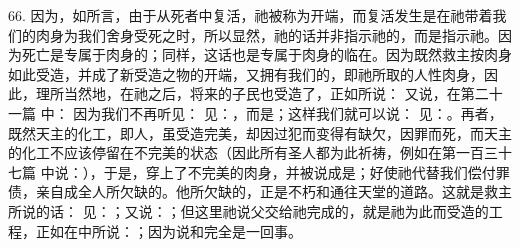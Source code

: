 66. 因为，如所言，由于从死者中复活，祂被称为开端，而复活发生是在祂带着我们的肉身为我们舍身受死之时，所以显然，祂的话并非指示祂的，而是指示祂。因为死亡是专属于肉身的；同样，这话也是专属于肉身的临在。因为既然救主按肉身如此受造，并成了新受造之物的开端，又拥有我们的，即祂所取的人性肉身，因此，理所当然地，在祂之后，将来的子民也受造了，正如所说： 又说，在第二十一篇 中： 因为我们不再听见： 见：，而是；这样我们就可以说： 见：。再者，既然天主的化工，即人，虽受造完美，却因过犯而变得有缺欠，因罪而死，而天主的化工不应该停留在不完美的状态（因此所有圣人都为此祈祷，例如在第一百三十七篇 中说：），于是，穿上了不完美的肉身，并被说成是；好使祂代替我们偿付罪债，亲自成全人所欠缺的。他所欠缺的，正是不朽和通往天堂的道路。这就是救主所说的话： 见：；又说：；但这里祂说父交给祂完成的，就是祂为此而受造的工程，正如在中所说：；因为说和完全是一回事。\par

